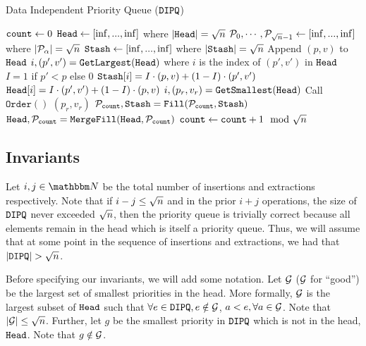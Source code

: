 	
\begin{algorithm}
	\caption{Data Independent Priority Queue ($\texttt{DIPQ}$)}
	\label{alg:ObvQueue}
	\begin{algorithmic}[1]
		\Function{$\DIPQInit$}{}
		\State ${\texttt{count}} \gets 0$
		\State $\texttt{Head} \gets [\inf, ..., \inf]$ where $|\texttt{Head}| = {\sqrt{n}}$
		\State $\mathcal{P}_0, \cdots, \mathcal{P}_{{\sqrt{n}}-1} \gets [\inf, ..., \inf]$ where $|\mathcal{P}_\alpha| = {\sqrt{n}}$
		\State $\texttt{Stash} \gets [\inf, ..., \inf]$ where $|\texttt{Stash}| = {\sqrt{n}}$
		\EndFunction
			\State Append $(p, v)$ to $\texttt{Head}$
			\State $i, (p', v') = \texttt{GetLargest}(\texttt{Head})$ where $i$ is the index of $(p', v')$ in $\texttt{Head}$
			\State $I = 1$ if $p' < p$ else $0$
			\State $\texttt{Stash}[i] = I \cdot (p, v) + (1 - I) \cdot (p', v')$
			\State $\texttt{Head}[i] = I \cdot (p', v') + (1 - I) \cdot (p, v)$
			\State $i, (p_r, v_r) = \texttt{GetSmallest}(\texttt{Head})$
			\State Call $\texttt{Order}()$ \label{algline:ObvPQOrderOp}
			\State \Return $(p_r, v_r)$
		\EndFunction
		\Function{$\DIPQOrder$}{}
			\State $\mathcal{P}_{{\texttt{count}}}, \texttt{Stash} = \texttt{Fill}(\mathcal{P}_{\texttt{count}}, \texttt{Stash})$
			\State $\texttt{Head}, \mathcal{P}_{\texttt{count}} = \texttt{MergeFill}(\texttt{Head}, \mathcal{P}_{\texttt{count}})$
			\State ${\texttt{count}} \gets {\texttt{count}} + 1 \mod {{\sqrt{n}}}$
		\EndFunction
	\end{algorithmic}
\end{algorithm}


\subsection{Invariants}
\label{subsec:invariants}
Let $i, j \in \N$ be the total number of insertions and extractions respectively. Note that if $i - j \leq {\sqrt{n}}$
and in the prior $i + j$ operations, the size of $\texttt{DIPQ}$ never exceeded ${\sqrt{n}}$, then the priority queue is trivially correct because all elements remain in the head which is itself a priority queue.
Thus, we will assume that at some point in the sequence of insertions and extractions, we had that $|\texttt{DIPQ}| > {\sqrt{n}}$.

Before specifying our invariants, we will add some notation. Let $\mathcal{G}$ ($\mathcal{G}$ for ``good'') be the largest set of smallest priorities in the head. More formally,
$\mathcal{G}$ is the largest subset of $\texttt{Head}$ such that $\forall e \in \texttt{DIPQ}, e \notin \mathcal{G}$, $a < e, \forall a \in \mathcal{G}$. Note that $|\mathcal{G}| \leq {\sqrt{n}}$.
Further, let $g$ be the smallest priority in $\texttt{DIPQ}$ which is not in the head, $\texttt{Head}$.
Note that $g \notin \mathcal{G}$.

